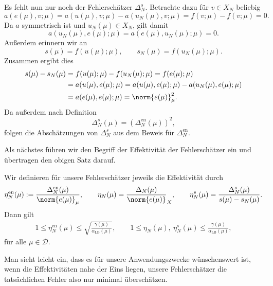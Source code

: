 \begin{Satz}
\begin{Beweis}
        Es fehlt nun nur noch der Fehlerschätzer $\Delta^s_N$. Betrachte dazu für $v \in X_N$ beliebig
        \begin{equation}
            a(e(\mu), v; \mu) = a(u(\mu), v; \mu) - a(u_N(\mu), v; \mu) = f(v; \mu) - f(v; \mu) = 0.
        \end{equation}
        Da $a$ symmetrisch ist und $u_N(\mu) \in X_N$, gilt damit
        \begin{equation}
            a(u_N(\mu), e(\mu); \mu) = a(e(\mu), u_N(\mu); \mu) = 0.
        \end{equation}
        Außerdem erinnern wir an
        \begin{equation}
            s(\mu) = f(u(\mu); \mu), \qquad s_N(\mu) = f(u_N(\mu); \mu).
        \end{equation}
        Zusammen ergibt dies
        \begin{align}
            s(\mu) - s_N(\mu) &= f(u(\mu); \mu) - f(u_N(\mu); \mu) = f(e(\mu); \mu) \\
            &= a(u(\mu), e(\mu); \mu) = a(u(\mu), e(\mu); \mu) - a(u_N(\mu), e(\mu); \mu)\\
            &= a(e(\mu), e(\mu); \mu) = \norm{e(\mu)}_{\mu}^2.
        \end{align}
        Da außerdem nach Definition
        \begin{equation}
            \Delta^s_N(\mu) = \left( \Delta^{\text{en}}_N(\mu) \right)^2,
        \end{equation}
        folgen die Abschätzungen von $\Delta^s_N$ aus dem Beweis für $\Delta^\text{en}_N$.
    \end{Beweis}
\end{Satz}

Als nächstes führen wir den Begriff der Effektivität der Fehlerschätzer ein und übertragen den obigen Satz darauf.

\begin{Korollar}
    \label{korollar:effektivitaeten}
    Wir definieren für unsere Fehlerschätzer jeweils die Effektivität durch
    \begin{equation}
        \eta^{\text{en}}_N(\mu) := \frac{\Delta^{\text{en}}_N(\mu)}{\norm{e(\mu)}_{\mu}}
        , \qquad
        \eta_N(\mu) = \frac{\Delta_N(\mu)}{\norm{e(\mu)}}_X
        , \qquad
        \eta^{s}_N(\mu) = \frac{\Delta^s_N(\mu)}{s(\mu) - s_N(\mu)}.
    \end{equation}
    Dann gilt
    \begin{align}
        1 \leq \eta^{\text{en}}_N(\mu) \leq \sqrt{\frac{\gamma(\mu)}{\alpha_{\text{LB}}(\mu)}}, \qquad
        1 \leq \eta_N(\mu),~\eta^{s}_N(\mu) \leq \frac{\gamma(\mu)}{\alpha_{\text{LB}}(\mu)},
    \end{align}
    für alle $\mu \in \mathcal D$.
\end{Korollar}
Man sieht leicht ein, dass es für unsere Anwendungszwecke wünschenswert ist, wenn die Effektivitäten nahe der Eins liegen, unsere Fehlerschätzer die tatsächlichen Fehler also nur minimal überschätzen.


